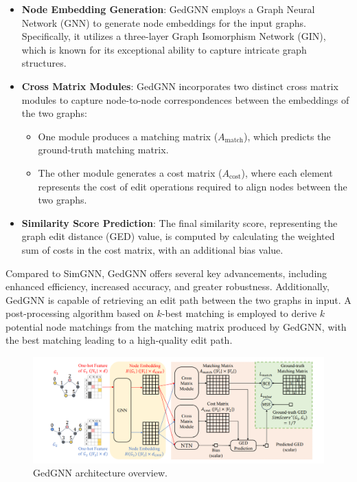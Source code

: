 \documentclass[../Thesis.tex]{subfiles}
\begin{document}
	\begin{itemize}
		\item \textbf{Node Embedding Generation}: GedGNN employs a Graph Neural Network (GNN) to generate node embeddings for the input graphs. Specifically, it utilizes a three-layer Graph Isomorphism Network (GIN), which is known for its exceptional ability to capture intricate graph structures.
		\item \textbf{Cross Matrix Modules}: GedGNN incorporates two distinct cross matrix modules to capture node-to-node correspondences between the embeddings of the two graphs:
		\begin{itemize}
			\item One module produces a matching matrix ($A_{\text{match}}$), which predicts the ground-truth matching matrix.
			\item The other module generates a cost matrix ($A_{\text{cost}}$), where each element represents the cost of edit operations required to align nodes between the two graphs.
		\end{itemize}
		\item \textbf{Similarity Score Prediction}: The final similarity score, representing the graph edit distance (GED) value, is computed by calculating the weighted sum of costs in the cost matrix, with an additional bias value.
	\end{itemize}
	
	Compared to SimGNN, GedGNN offers several key advancements, including enhanced efficiency, increased accuracy, and greater robustness. Additionally, GedGNN is capable of retrieving an edit path between the two graphs in input. A post-processing algorithm based on \(k\)-best matching is employed to derive \(k\) potential node matchings from the matching matrix produced by GedGNN, with the best matching leading to a high-quality edit path.
	
	\begin{figure}[H]
		\centering
		\includegraphics[width=\textwidth]{Images/gedgnn_architecture.png}
		\caption{GedGNN architecture overview.}
		\label{fig:gedgnn_architecture}
	\end{figure}
	
\end{document}
